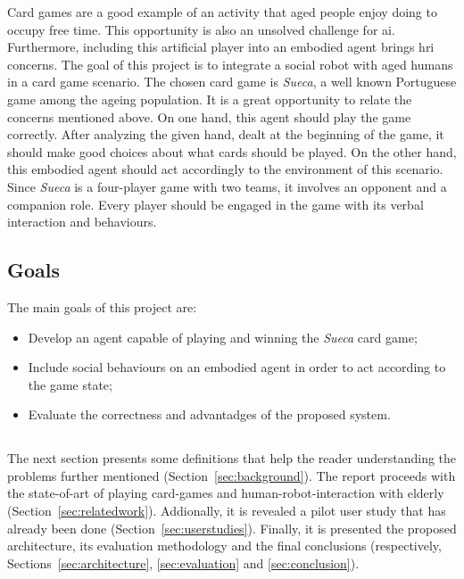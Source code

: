 Card games are a good example of an activity that aged people enjoy doing to occupy free time.
This opportunity is also an unsolved challenge for \gls{ai}.
Furthermore, including this artificial player into an embodied agent brings \gls{hri} concerns.
The goal of this project is to integrate a social robot with aged humans in a card game scenario.
The chosen card game is \emph{Sueca}, a well known Portuguese game among the ageing population.
It is a great opportunity to relate the concerns mentioned above.
On one hand, this agent should play the game correctly.
After analyzing the given hand, dealt at the beginning of the game, it should make good choices about what cards should be played.
On the other hand, this embodied agent should act accordingly to the environment of this scenario.
Since \emph{Sueca} is a four-player game with two teams, it involves an opponent and a companion role.
Every player should be engaged in the game with its verbal interaction and behaviours.


\subsection{Goals}
\label{sec:goals}

The main goals of this project are:
\begin{itemize}
\item Develop an agent capable of playing and winning the \emph{Sueca} card game;
\item Include social behaviours on an embodied agent in order to act according to the game state;
\item Evaluate the correctness and advantadges of the proposed system.
\end{itemize}

\subsection*{\centering*}

The next section presents some definitions that help the reader understanding the problems further mentioned (Section~\ref{sec:background}).
The report proceeds with the state-of-art of playing card-games and human-robot-interaction with elderly (Section~\ref{sec:relatedwork}).
Addionally, it is revealed a pilot user study that has already been done (Section~\ref{sec:userstudies}).
Finally, it is presented the proposed architecture, its evaluation methodology and the final conclusions (respectively, Sections~\ref{sec:architecture}, \ref{sec:evaluation} and \ref{sec:conclusion}).


